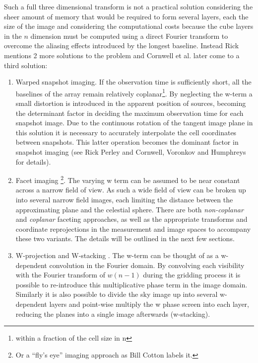 Such a full three dimensional transform is not a practical solution considering the sheer amount of memory that would be required to form several layers,
each the size of the image and considering the computational costs because the cube layers in the $n$ dimension must be computed using a direct Fourier 
transform to overcome the aliasing effects introduced by the longest baseline. Instead Rick \cite[Lecture 19]{taylor1999synthesis} mentions 2 more 
solutions to the problem and Cornwell et al. \cite{cornwell2008noncoplanar} later come to a third solution:
\begin{enumerate}
 \item Warped snapshot imaging. If the observation time is sufficiently short, all the baselines of the array remain relatively coplanar\footnote{within a 
 fraction of the cell size in n}. By neglecting the w-term a small distortion is introduced in the apparent position of sources, becoming the determinant
 factor in deciding the maximum observation time for each snapshot image. Due to the continuous rotation of the tangent image plane in this solution it is necessary
 to accurately interpolate the cell coordinates between snapshots. This latter operation becomes the dominant factor in snapshot imaging (see Rick Perley \cite[Lecture 19]{taylor1999synthesis}
 and Cornwell, Voronkov and Humphreys \cite{cornwell2012wide} for details).
 \item Facet imaging \footnote{Or a ``fly's eye'' imaging approach as Bill Cotton labels it.}. The varying w term can be assumed to be near constant across a narrow field of view. As such a wide field of view can be broken
 up into several narrow field images, each limiting the distance between the approximating plane and the celestial sphere. There are both \emph{non-coplanar} and \emph{coplanar}
 faceting approaches, as well as the appropriate transforms and coordinate reprojections in the measurement and image spaces to accompany these two variants. The details will be 
 outlined in the next few sections.
 \item W-projection \cite{cornwell2008noncoplanar} and W-stacking \cite{offringa2014wsclean}. The w-term can be thought of as a w-dependent convolution
 in the Fourier domain. By convolving each visibility with the Fourier transform of $w(n-1)$ during the gridding process it is possible to re-introduce 
 this multiplicative phase term in the image domain. Similarly it is also possible to divide the sky image up into several w-dependent layers and point-wise
 multiply the w phase screen into each layer, reducing the planes into a single image afterwards (w-stacking).
\end{enumerate}

